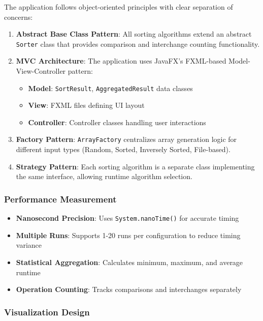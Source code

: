 \documentclass[12pt,a4paper]{article}
\begin{document}
The application follows object-oriented principles with clear separation of concerns:

\begin{enumerate}
    \item \textbf{Abstract Base Class Pattern}: All sorting algorithms extend an abstract \texttt{Sorter} class that provides comparison and interchange counting functionality.
    
    \item \textbf{MVC Architecture}: The application uses JavaFX's FXML-based Model-View-Controller pattern:
    \begin{itemize}
        \item \textbf{Model}: \texttt{SortResult}, \texttt{AggregatedResult} data classes
        \item \textbf{View}: FXML files defining UI layout
        \item \textbf{Controller}: Controller classes handling user interactions
    \end{itemize}
    
    \item \textbf{Factory Pattern}: \texttt{ArrayFactory} centralizes array generation logic for different input types (Random, Sorted, Inversely Sorted, File-based).
    
    \item \textbf{Strategy Pattern}: Each sorting algorithm is a separate class implementing the same interface, allowing runtime algorithm selection.
\end{enumerate}

\subsubsection{Performance Measurement}

\begin{itemize}
    \item \textbf{Nanosecond Precision}: Uses \texttt{System.nanoTime()} for accurate timing
    \item \textbf{Multiple Runs}: Supports 1-20 runs per configuration to reduce timing variance
    \item \textbf{Statistical Aggregation}: Calculates minimum, maximum, and average runtime
    \item \textbf{Operation Counting}: Tracks comparisons and interchanges separately
\end{itemize}

\subsubsection{Visualization Design}
\end{document}
